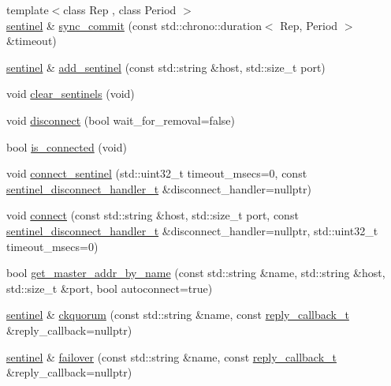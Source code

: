 \begin{DoxyCompactItemize}
\item 
{\footnotesize template$<$class Rep , class Period $>$ }\\\hyperlink{classcpp__redis_1_1sentinel}{sentinel} \& \hyperlink{classcpp__redis_1_1sentinel_afbaa0b80266f70ad98c0bf8f28c533ab}{sync\+\_\+commit} (const std\+::chrono\+::duration$<$ Rep, Period $>$ \&timeout)
\item 
\hyperlink{classcpp__redis_1_1sentinel}{sentinel} \& \hyperlink{classcpp__redis_1_1sentinel_a548dad45711dc2e7da7e0803d5a74a2e}{add\+\_\+sentinel} (const std\+::string \&host, std\+::size\+\_\+t port)
\item 
void \hyperlink{classcpp__redis_1_1sentinel_ac36640b3f392970c72f5a513a2d61ac7}{clear\+\_\+sentinels} (void)
\item 
void \hyperlink{classcpp__redis_1_1sentinel_af607d8c5a20ada35daad251f1b1b2f68}{disconnect} (bool wait\+\_\+for\+\_\+removal=false)
\item 
bool \hyperlink{classcpp__redis_1_1sentinel_aa98a0593e6e7c04d8d0dd1f292cdce47}{is\+\_\+connected} (void)
\item 
void \hyperlink{classcpp__redis_1_1sentinel_ad10e26012984341c82dd4c6a7ef2253b}{connect\+\_\+sentinel} (std\+::uint32\+\_\+t timeout\+\_\+msecs=0, const \hyperlink{classcpp__redis_1_1sentinel_a923e06b5b700c16dffec8a01d2fa9aa4}{sentinel\+\_\+disconnect\+\_\+handler\+\_\+t} \&disconnect\+\_\+handler=nullptr)
\item 
void \hyperlink{classcpp__redis_1_1sentinel_a1dfba8240daf7cfa7502f57957cffbda}{connect} (const std\+::string \&host, std\+::size\+\_\+t port, const \hyperlink{classcpp__redis_1_1sentinel_a923e06b5b700c16dffec8a01d2fa9aa4}{sentinel\+\_\+disconnect\+\_\+handler\+\_\+t} \&disconnect\+\_\+handler=nullptr, std\+::uint32\+\_\+t timeout\+\_\+msecs=0)
\item 
bool \hyperlink{classcpp__redis_1_1sentinel_a2886493b40b00dfafdd3b22dfe28e0c3}{get\+\_\+master\+\_\+addr\+\_\+by\+\_\+name} (const std\+::string \&name, std\+::string \&host, std\+::size\+\_\+t \&port, bool autoconnect=true)
\item 
\hyperlink{classcpp__redis_1_1sentinel}{sentinel} \& \hyperlink{classcpp__redis_1_1sentinel_aaed03955e468d9f7c3df37376ecafc3a}{ckquorum} (const std\+::string \&name, const \hyperlink{classcpp__redis_1_1sentinel_ae1a150ff8787208c47414397a061c9a7}{reply\+\_\+callback\+\_\+t} \&reply\+\_\+callback=nullptr)
\item 
\hyperlink{classcpp__redis_1_1sentinel}{sentinel} \& \hyperlink{classcpp__redis_1_1sentinel_abd4ee07b5a17ca15b74d25702687e53a}{failover} (const std\+::string \&name, const \hyperlink{classcpp__redis_1_1sentinel_ae1a150ff8787208c47414397a061c9a7}{reply\+\_\+callback\+\_\+t} \&reply\+\_\+callback=nullptr)

\end{DoxyCompactItemize}
